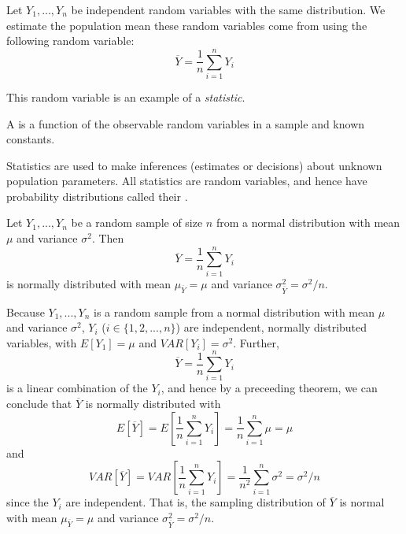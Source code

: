 \documentclass[12pt, a4paper, twoside, openright, titlepage]{book}
\begin{document}
\begin{defn}{}{}
    Let $Y_1,...,Y_n$ be independent random variables with the same distribution. We estimate the population mean these random variables come from using the following random variable: \begin{equation*}
        \overline{Y} = \frac{1}{n}\sum\limits_{i=1}^nY_i
    \end{equation*}
\end{defn}

This random variable is an example of a \emph{statistic}.

\begin{defn}{}{}
    A  is a function of the observable random variables in a sample and known constants.
\end{defn}

Statistics are used to make inferences (estimates or decisions) about unknown population parameters. All statistics are random variables, and hence have probability distributions called their . 

\begin{thm}{}{}
    Let $Y_1,...,Y_n$ be a random sample of size $n$ from a normal distribution with mean $\mu$ and variance $\sigma^2$. Then \begin{equation*}
        \overline{Y} = \frac{1}{n}\sum\limits_{i=1}^nY_i
    \end{equation*}
    is normally distributed with mean $\mu_{\overline{Y}} = \mu$ and variance $\sigma^2_{\overline{Y}} = \sigma^2/n$.
\end{thm}
\begin{proof*}{}{}
    Because $Y_1,...,Y_n$ is a random sample from a normal distribution with mean $\mu$ and variance $\sigma^2$, $Y_i$ ($i \in \{1,2,...,n\}$) are independent, normally distributed variables, with $E[Y_1] = \mu$ and $VAR[Y_i] = \sigma^2$. Further, \begin{equation*}
        \overline{Y} = \frac{1}{n}\sum\limits_{i=1}^nY_i
    \end{equation*}
    is a linear combination of the $Y_i$, and hence by a preceeding theorem, we can conclude that $\overline{Y}$ is normally distributed with \begin{equation*}
        E[\overline{Y}] = E\left[\frac{1}{n}\sum\limits_{i=1}^nY_i\right] = \frac{1}{n}\sum\limits_{i=1}^n\mu = \mu
    \end{equation*}
    and \begin{equation*}
        VAR[\overline{Y}] = VAR\left[\frac{1}{n}\sum\limits_{i=1}^nY_i\right] = \frac{1}{n^2}\sum\limits_{i=1}^n\sigma^2 = \sigma^2/n
    \end{equation*}
    since the $Y_i$ are independent. That is, the sampling distribution of $\overline{Y}$ is normal with mean $\mu_{\overline{Y}} = \mu$ and variance $\sigma^2_{\overline{Y}} = \sigma^2/n$.
\end{proof*}
\end{document}
